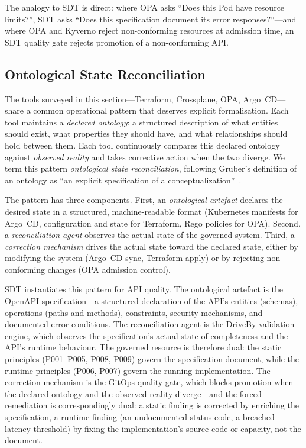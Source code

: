 The analogy to SDT is direct: where OPA asks ``Does this Pod have resource limits?'', SDT asks ``Does this specification document its error responses?''---and where OPA and Kyverno reject non-conforming resources at admission time, an SDT quality gate rejects promotion of a non-conforming API.

\subsection{Ontological State Reconciliation}
\label{subsec:ontological-reconciliation}

The tools surveyed in this section---Terraform, Crossplane, OPA, Argo~CD---share a common operational pattern that deserves explicit formalisation. Each tool maintains a \textit{declared ontology}: a structured description of what entities should exist, what properties they should have, and what relationships should hold between them. Each tool continuously compares this declared ontology against \textit{observed reality} and takes corrective action when the two diverge. We term this pattern \textit{ontological state reconciliation}, following Gruber's definition of an ontology as ``an explicit specification of a conceptualization''~\cite{gruber-ontology}.

The pattern has three components. First, an \textit{ontological artefact} declares the desired state in a structured, machine-readable format (Kubernetes manifests for Argo~CD, configuration and state for Terraform, Rego policies for OPA). Second, a \textit{reconciliation agent} observes the actual state of the governed system. Third, a \textit{correction mechanism} drives the actual state toward the declared state, either by modifying the system (Argo~CD sync, Terraform apply) or by rejecting non-conforming changes (OPA admission control).

SDT instantiates this pattern for API quality. The ontological artefact is the OpenAPI specification---a structured declaration of the API's entities (schemas), operations (paths and methods), constraints, security mechanisms, and documented error conditions. The reconciliation agent is the DriveBy validation engine, which observes the specification's actual state of completeness and the API's runtime behaviour. The governed resource is therefore dual: the static principles (P001--P005, P008, P009) govern the specification document, while the runtime principles (P006, P007) govern the running implementation. The correction mechanism is the GitOps quality gate, which blocks promotion when the declared ontology and the observed reality diverge---and the forced remediation is correspondingly dual: a static finding is corrected by enriching the specification, a runtime finding (an undocumented status code, a breached latency threshold) by fixing the implementation's source code or capacity, not the document.

